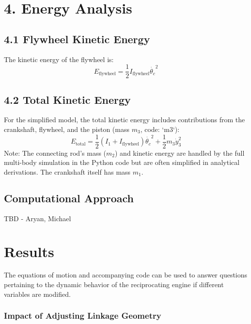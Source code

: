 \documentclass[12pt]{article}
\begin{document}
\section*{4. Energy Analysis}
\subsection*{4.1 Flywheel Kinetic Energy}
The kinetic energy of the flywheel is:
\begin{equation}
    E_{\text{flywheel}} = \frac{1}{2} I_{\text{flywheel}} \dot{\theta_c}^2
\end{equation}

\subsection*{4.2 Total Kinetic Energy}
For the simplified model, the total kinetic energy includes contributions from the crankshaft, flywheel, and the piston (mass \(m_3\), code: `m3`):
\begin{equation}
    E_{\text{total}} = \frac{1}{2} (I_1 + I_{\text{flywheel}}) \dot{\theta_c}^2 + \frac{1}{2} m_3 \dot{y}_3^2
\end{equation}
Note: The connecting rod's mass (\(m_2\)) and kinetic energy are handled by the full multi-body simulation in the Python code but are often simplified in analytical derivations. The crankshaft itself has mass \(m_1\).

\subsection{Computational Approach}

TBD - Aryan, Michael

\section{Results} 


The equations of motion and accompanying code can be used to answer questions pertaining to the dynamic behavior of the reciprocating engine if different variables are modified. 

\subsubsection{Impact of Adjusting Linkage Geometry}
\end{document}
